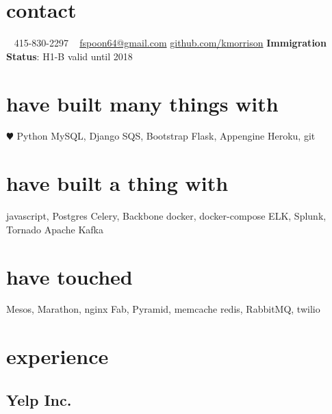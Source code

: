 \documentclass[]{friggeri-cv} %
\begin{document}


\begin{aside} %
\section{contact}
~
415-830-2297
~
\href{mailto:fspoon64@gmail.com}{fspoon64@gmail.com}
\href{https://github.com/kmorrison}{github.com/kmorrison}
\textbf{Immigration Status}: H1-B valid until 2018
\section{have built many things with}
{\color{red} $\varheartsuit$} Python
MySQL, Django
SQS, Bootstrap
Flask, Appengine
Heroku, git
\section{have built a thing with}
javascript, Postgres 
Celery, Backbone
docker, docker-compose
ELK, Splunk, Tornado
Apache Kafka
\section{have touched}
Mesos, Marathon, nginx
Fab, Pyramid, memcache
redis, RabbitMQ, twilio
\end{aside}


\section{experience}

\subsection{Yelp Inc.}
\end{document}
